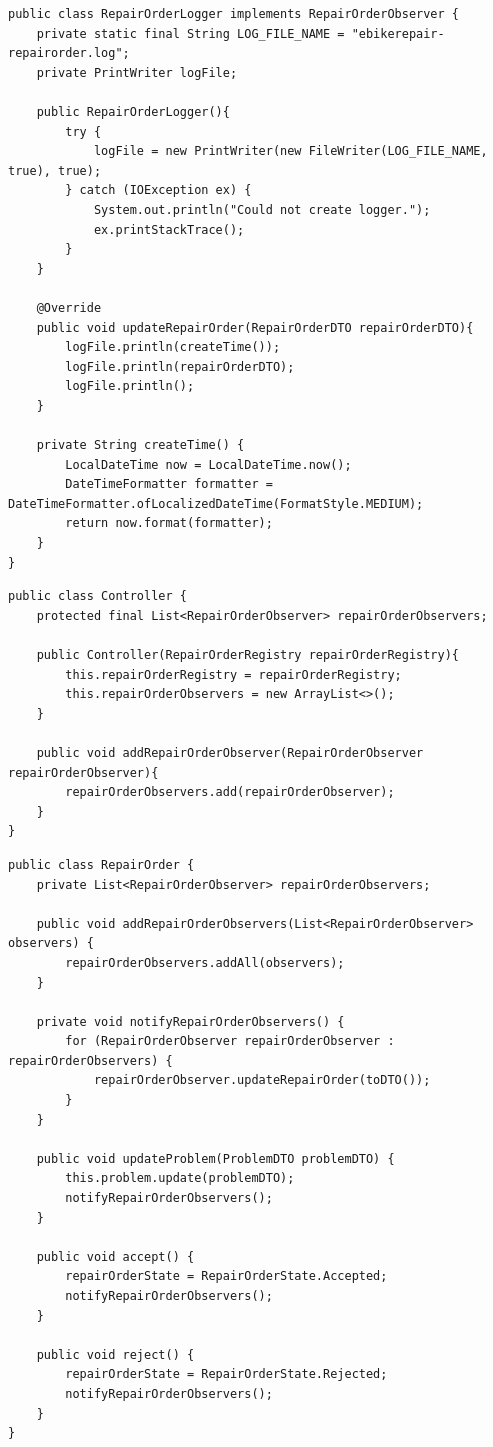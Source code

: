 \documentclass[a4paper]{scrartcl}
\begin{document}
\begin{lstlisting}[style=javastyle, caption={RepairOrderLogger implementing RepairOrderObserver}]
public class RepairOrderLogger implements RepairOrderObserver {
    private static final String LOG_FILE_NAME = "ebikerepair-repairorder.log";
    private PrintWriter logFile;

    public RepairOrderLogger(){
        try {
            logFile = new PrintWriter(new FileWriter(LOG_FILE_NAME, true), true);
        } catch (IOException ex) {
            System.out.println("Could not create logger.");
            ex.printStackTrace();
        }
    }

    @Override
    public void updateRepairOrder(RepairOrderDTO repairOrderDTO){
        logFile.println(createTime());
        logFile.println(repairOrderDTO);
        logFile.println();
    }

    private String createTime() {
        LocalDateTime now = LocalDateTime.now();
        DateTimeFormatter formatter = DateTimeFormatter.ofLocalizedDateTime(FormatStyle.MEDIUM);
        return now.format(formatter);
    }
}
\end{lstlisting}

\begin{lstlisting}[style=javastyle, caption={Controller storing observers}]
public class Controller {
    protected final List<RepairOrderObserver> repairOrderObservers;

    public Controller(RepairOrderRegistry repairOrderRegistry){
        this.repairOrderRegistry = repairOrderRegistry;
        this.repairOrderObservers = new ArrayList<>();
    }

    public void addRepairOrderObserver(RepairOrderObserver repairOrderObserver){
        repairOrderObservers.add(repairOrderObserver);
    }
}
\end{lstlisting}

\begin{lstlisting}[style=javastyle, caption={RepairOrder as the observed subject}]
public class RepairOrder {
    private List<RepairOrderObserver> repairOrderObservers;

    public void addRepairOrderObservers(List<RepairOrderObserver> observers) {
        repairOrderObservers.addAll(observers);
    }

    private void notifyRepairOrderObservers() {
        for (RepairOrderObserver repairOrderObserver : repairOrderObservers) {
            repairOrderObserver.updateRepairOrder(toDTO());
        }
    }

    public void updateProblem(ProblemDTO problemDTO) {
        this.problem.update(problemDTO);
        notifyRepairOrderObservers();
    }

    public void accept() {
        repairOrderState = RepairOrderState.Accepted;
        notifyRepairOrderObservers();
    }

    public void reject() {
        repairOrderState = RepairOrderState.Rejected;
        notifyRepairOrderObservers();
    }
}
\end{lstlisting}
\end{document}
